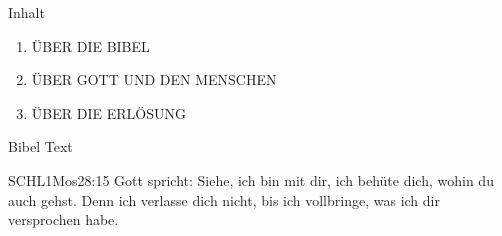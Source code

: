 \documentclass[aspectratio=43]{beamer}
\begin{document}
\begin{frame}{Inhalt}
    \begin{enumerate}
        \item \uppercase{über die bibel}
        \item \uppercase{über gott und den Menschen}
        \item \uppercase{über die Erlösung}        
    \end{enumerate}
\end{frame}
\begin{frame}{Bibel Text}
    \begin{bibelbox}{SCHL}{1Mos}{28:15}
        Gott spricht: Siehe, ich bin mit dir,
        ich behüte dich, wohin du auch gehst.
        Denn ich verlasse dich nicht,
        bis ich vollbringe, was ich dir versprochen habe.
        \end{bibelbox}
\end{frame}
\end{document}
